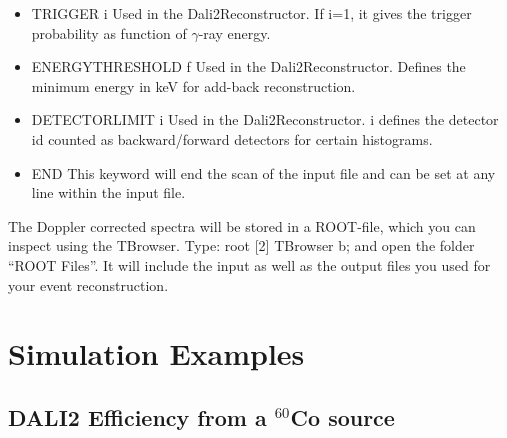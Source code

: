 \documentclass[12pt]{book}
\begin{document}
\begin{itemize}
\item TRIGGER i\hfill{} \linebreak
  Used in the Dali2Reconstructor. If i=1, it gives the trigger probability as function of $\gamma$-ray
  energy.
\item ENERGYTHRESHOLD f\hfill{} \linebreak
  Used in the Dali2Reconstructor. Defines the minimum energy in keV for add-back reconstruction.
\item DETECTORLIMIT i\hfill{} \linebreak
  Used in the Dali2Reconstructor. i defines the detector id counted as backward/forward detectors
  for certain histograms.
\item END  \hfill{} \linebreak
  This keyword will end the scan of the input file and can be set at any line within the input file.
\end{itemize}

The Doppler corrected spectra will be stored in a ROOT-file, which you can inspect using the TBrowser. 
Type:\hfill{}
\linebreak
\linebreak
{\ttfamily root [2] TBrowser b;
}
\linebreak
\linebreak
and open the folder ``ROOT Files''. It will include the input as well as the output files you used for your 
event reconstruction.

\chapter{Simulation Examples}

\section{DALI2 Efficiency from a $^{60}$Co source}
\end{document}
